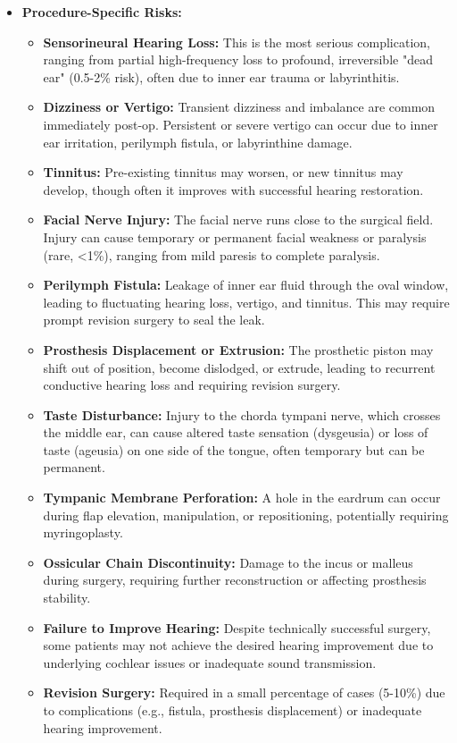 \begin{itemize}
  \item \textbf{Procedure-Specific Risks:}
    \begin{itemize}
      \item \textbf{Sensorineural Hearing Loss:} This is the most serious complication, ranging from partial high-frequency loss to profound, irreversible "dead ear" (0.5-2\% risk), often due to inner ear trauma or labyrinthitis.
      \item \textbf{Dizziness or Vertigo:} Transient dizziness and imbalance are common immediately post-op. Persistent or severe vertigo can occur due to inner ear irritation, perilymph fistula, or labyrinthine damage.
      \item \textbf{Tinnitus:} Pre-existing tinnitus may worsen, or new tinnitus may develop, though often it improves with successful hearing restoration.
      \item \textbf{Facial Nerve Injury:} The facial nerve runs close to the surgical field. Injury can cause temporary or permanent facial weakness or paralysis (rare, <1\%), ranging from mild paresis to complete paralysis.
      \item \textbf{Perilymph Fistula:} Leakage of inner ear fluid through the oval window, leading to fluctuating hearing loss, vertigo, and tinnitus. This may require prompt revision surgery to seal the leak.
      \item \textbf{Prosthesis Displacement or Extrusion:} The prosthetic piston may shift out of position, become dislodged, or extrude, leading to recurrent conductive hearing loss and requiring revision surgery.
      \item \textbf{Taste Disturbance:} Injury to the chorda tympani nerve, which crosses the middle ear, can cause altered taste sensation (dysgeusia) or loss of taste (ageusia) on one side of the tongue, often temporary but can be permanent.
      \item \textbf{Tympanic Membrane Perforation:} A hole in the eardrum can occur during flap elevation, manipulation, or repositioning, potentially requiring myringoplasty.
      \item \textbf{Ossicular Chain Discontinuity:} Damage to the incus or malleus during surgery, requiring further reconstruction or affecting prosthesis stability.
      \item \textbf{Failure to Improve Hearing:} Despite technically successful surgery, some patients may not achieve the desired hearing improvement due to underlying cochlear issues or inadequate sound transmission.
      \item \textbf{Revision Surgery:} Required in a small percentage of cases (5-10\%) due to complications (e.g., fistula, prosthesis displacement) or inadequate hearing improvement.
    \end{itemize}
\end{itemize}

